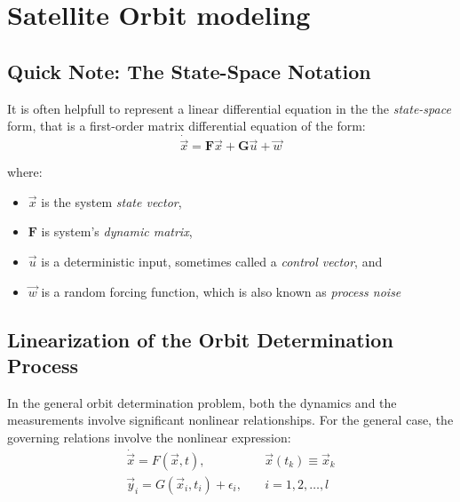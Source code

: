 \chapter{Satellite Orbit modeling}
\label{ch:satellite-orbit-modeling}

\section{Quick Note: The State-Space Notation}
It is often helpfull to represent a linear differential equation in the the 
\emph{state-space} form, that is a first-order matrix differential equation of 
the form:
\begin{equation}
  \dot{\vec{x}} = \bm{F} \vec{x} + \bm{G} \vec{u} + \vec{w}
\end{equation}

where:
\begin{itemize}
  \item \(\vec{x}\) is the system \emph{state vector},
  \item \(\bm{F}\) is system's \emph{dynamic matrix},
  \item \(\vec{u}\) is a deterministic input, sometimes called a \emph{control vector}, and
  \item \(\vec{w}\) is a random forcing function, which is also known as \emph{process noise}
\end{itemize}

\section{Linearization of the Orbit Determination Process}
In the general orbit determination problem, both the dynamics and the measurements 
involve significant nonlinear relationships. For the general case, the governing 
relations involve the nonlinear expression:
\begin{subequations}
\begin{align}
  \dot{\vec{x}} = F( \vec{x}, t ), 
    & \quad \vec{x}(t_k ) \equiv \vec{x}_k 
    \label{eq:tapley421}\\
  \vec{y}_i = G( \vec{x}_i , t_i ) + {\epsilon}_i , 
    & \quad  i=1,2,\ldots ,l
    \label{eq:tapley422}
\end{align}
\end{subequations}

